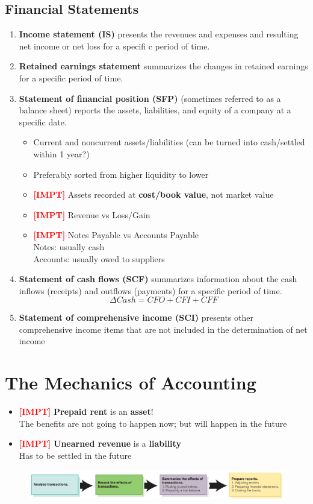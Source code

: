 \documentclass{article}
\newcommand{\impt}[0]{\textcolor{red}{\textbf{[IMPT] }}}
\begin{document}
\begin{multicols}{2}
\subsection{Financial Statements}
\begin{enumerate}
	\item \textbf{Income statement (IS)} presents the revenues and expenses and resulting net  income or net loss for a specifi c period of time.
	\item \textbf{Retained earnings statement} summarizes the changes in retained earnings for a specific period of time.
	\item \textbf{Statement of financial position (SFP)} (sometimes referred to as a balance sheet) reports the assets, liabilities, and equity of a company at a specific date.
	\begin{itemize}
		\item Current and noncurrent assets/liabilities (can be turned into cash/settled within 1 year?)
		\item Preferably sorted from higher liquidity to lower
		\item \impt Assets recorded at \textbf{cost/book value}, not market value
		\item \impt Revenue vs Loss/Gain
		\item \impt Notes Payable vs Accounts Payable \\
		Notes: usually cash\\
		Accounts: usually owed to suppliers
	\end{itemize}
	\item \textbf{Statement of cash flows (SCF)} summarizes information about the cash inflows (receipts) and outflows (payments) for a specific period of time.
	$$\Delta Cash = CFO + CFI + CFF$$
	\item \textbf{Statement of comprehensive income (SCI)} presents other comprehensive income items that are not included in the determination of net income
\end{enumerate}

\section{The Mechanics of Accounting}
\begin{itemize}
	\item \impt \textbf{Prepaid rent} is an \textbf{asset}!\\
	The benefits are not going to happen now; but will happen in the future
	\item \impt \textbf{Unearned revenue} is a \textbf{liability}\\
	Has to be settled in the future
\end{itemize}
\end{multicols}
\begin{figure}[H]
	\includegraphics[width=\linewidth]{image/acc_cycle.png}
\end{figure}
%
\end{document}
